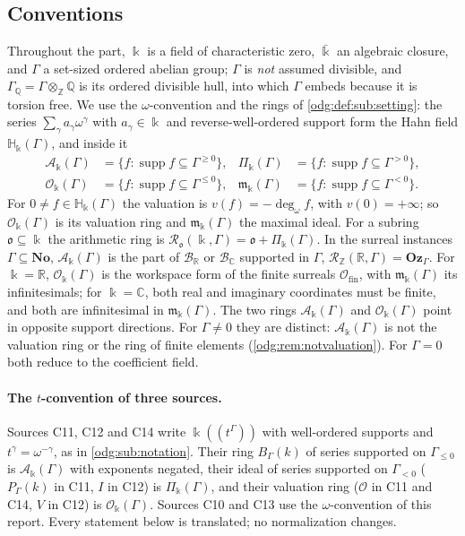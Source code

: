 \documentclass[11pt,oneside]{article}
\numberwithin{equation}{section}
\theoremstyle{definition}
\theoremstyle{remark}
\newcommand{\No}{\mathbf{No}}
\newcommand{\Oz}{\mathbf{Oz}}
\newcommand{\Z}{\mathbb Z}
\newcommand{\Q}{\mathbb Q}
\newcommand{\R}{\mathbb R}
\newcommand{\C}{\mathbb C}
\newcommand{\BR}{\mathcal B_{\R}}
\newcommand{\BC}{\mathcal B_{\C}}
\newcommand{\supp}{\operatorname{supp}}
\newcommand{\ddeg}{\operatorname{deg}_{\omega}}
\newcommand{\Ofin}{\mathcal O_{\mathrm{fin}}}
\newcommand{\crH}{\mathbb H_\Bbbk(\Gamma)}
\newcommand{\crA}{\mathcal A_\Bbbk(\Gamma)}
\newcommand{\crP}{\Pi_\Bbbk(\Gamma)}
\newcommand{\crO}{\mathcal O_\Bbbk(\Gamma)}
\newcommand{\crm}{\mathfrak m_\Bbbk(\Gamma)}
\begin{document}
\subsection{Conventions}\label{odg:cr:sub:conventions}

Throughout the part, $\Bbbk$ is a field of characteristic zero, $\bar\Bbbk$ an
algebraic closure, and $\Gamma$ a set-sized ordered abelian group; $\Gamma$ is
\emph{not} assumed divisible, and $\Gamma_\Q=\Gamma\otimes_\Z\Q$ is its ordered
divisible hull, into which $\Gamma$ embeds because it is torsion free. We use the
$\omega$-convention and the rings of \cref{odg:def:sub:setting}: the series
$\sum_\gamma a_\gamma\omega^\gamma$ with $a_\gamma\in\Bbbk$ and reverse-well-ordered
support form the Hahn field $\crH$, and inside it
\begin{align*}
 \crA&=\{f:\supp f\subseteq\Gamma^{\ge0}\},&
 \crP&=\{f:\supp f\subseteq\Gamma^{>0}\},\\
 \crO&=\{f:\supp f\subseteq\Gamma^{\le0}\},&
 \crm&=\{f:\supp f\subseteq\Gamma^{<0}\}.
\end{align*}
For $0\ne f\in\crH$ the valuation is $v(f)=-\ddeg f$, with $v(0)=+\infty$; so
$\crO$ is its valuation ring and $\crm$ the maximal ideal. For a subring
$\mathfrak o\subseteq\Bbbk$ the arithmetic ring is
$\mathcal R_{\mathfrak o}(\Bbbk,\Gamma)=\mathfrak o+\crP$. In the surreal instances
$\Gamma\subseteq\No$, $\crA$ is the part of $\BR$ or $\BC$ supported in $\Gamma$,
$\mathcal R_\Z(\R,\Gamma)=\Oz_\Gamma$. For $\Bbbk=\R$, $\crO$ is the
workspace form of the finite surreals $\Ofin$, with $\crm$ its infinitesimals;
for $\Bbbk=\C$, both real and imaginary coordinates must be finite,
and both are infinitesimal in $\crm$. The two rings $\crA$
and $\crO$ point in opposite support directions. For $\Gamma\ne0$ they
are distinct: $\crA$ is not the valuation ring or the ring of finite
elements (\cref{odg:rem:notvaluation}). For $\Gamma=0$ both reduce to
the coefficient field.

\paragraph{The $t$-convention of three sources.} Sources C11, C12 and C14 write
$\Bbbk((t^\Gamma))$ with well-ordered supports and $t^\gamma=\omega^{-\gamma}$, as
in \cref{odg:sub:notation}. Their ring $B_\Gamma(k)$ of series supported on
$\Gamma_{\le0}$ is $\crA$ with exponents negated, their ideal of series supported
on $\Gamma_{<0}$ ($P_\Gamma(k)$ in C11, $I$ in C12) is $\crP$, and their
valuation ring ($\mathcal O$ in C11 and C14, $V$ in C12) is $\crO$. Sources C10
and C13 use the $\omega$-convention of this report. Every statement below is
translated; no normalization changes.
\end{document}
